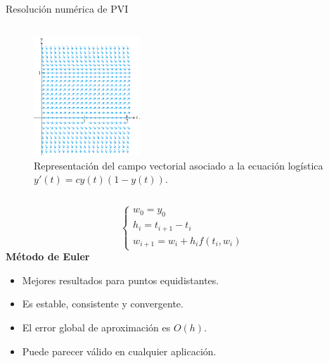 {\begin{frame}{Resolución numérica de PVI}
\begin{columns}
			
			\begin{figure}[h]
				\centering
				\includegraphics[width=4cm]{./Images/interpret-pvi.png}
					\caption{Representación del campo vectorial asociado a la ecuación logística $y'(t) = c y(t) (1 - y(t))$.} 
			\end{figure}
		\end{columns}			
	\end{frame}
}
		
{
		
	\begin{frame}
			\begin{tcolorbox}[colback=ChetwodeBlue!10,colframe=ChetwodeBlue!60]
				\begin{equation}
					\begin{cases}
					w_0=y_0 \\
					h_{i} = t_{i+1} - t_i \\
					w_{i+1} = w_i + h_{i} f(t_i,w_i)
					\end{cases}
				\end{equation}
				\centering
				\fontsize{10}{8}\selectfont	
				\textbf{Método de Euler}
				\fontsize{9}{8}\selectfont								
				\begin{itemize}
					\item Mejores resultados para puntos equidistantes.
					\item Es estable, consistente y convergente.
					\item El error global de aproximación es $O(h)$.
					\item Puede parecer válido en cualquier aplicación.
				\end{itemize}
			\end{tcolorbox}	
	\end{frame}
}

